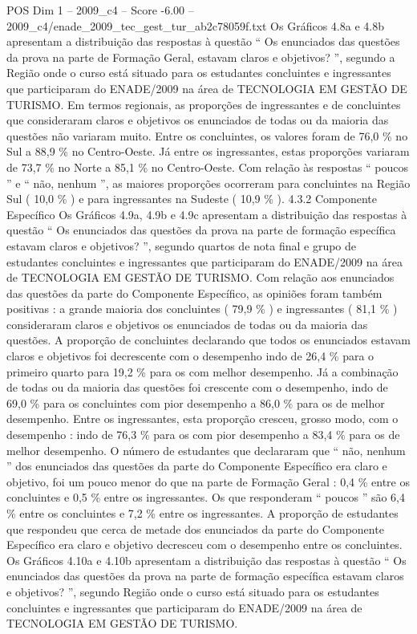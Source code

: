 \begin{textsample}{POS Dim 1 – 2009\_c4 – Score -6.00 – 2009\_c4/enade\_2009\_tec\_gest\_tur\_ab2c78059f.txt}
Os Gráficos 4.8a e 4.8b apresentam a distribuição das respostas à questão “ Os enunciados das questões da prova na parte de Formação Geral, estavam claros e objetivos? ”, segundo a Região onde o curso está situado para os estudantes concluintes e ingressantes que participaram do ENADE/2009 na área de TECNOLOGIA EM GESTÃO DE TURISMO.
Em termos regionais, as proporções de ingressantes e de concluintes que consideraram claros e objetivos os enunciados de todas ou da maioria das questões não variaram muito.
Entre os concluintes, os valores foram de 76,0 \% no Sul a 88,9 \% no Centro-Oeste.
Já entre os ingressantes, estas proporções variaram de 73,7 \% no Norte a 85,1 \% no Centro-Oeste.
Com relação às respostas “ poucos ” e “ não, nenhum ”, as maiores proporções ocorreram para concluintes na Região Sul ( 10,0 \% ) e para ingressantes na Sudeste ( 10,9 \% ). 4.3.2 Componente Específico Os Gráficos 4.9a, 4.9b e 4.9c apresentam a distribuição das respostas à questão “ Os enunciados das questões da prova na parte de formação específica estavam claros e objetivos? ”, segundo quartos de nota final e grupo de estudantes concluintes e ingressantes que participaram do ENADE/2009 na área de TECNOLOGIA EM GESTÃO DE TURISMO.
Com relação aos enunciados das questões da parte do Componente Específico, as opiniões foram também positivas : a grande maioria dos concluintes ( 79,9 \% ) e ingressantes ( 81,1 \% ) consideraram claros e objetivos os enunciados de todas ou da maioria das questões.
A proporção de concluintes declarando que todos os enunciados estavam claros e objetivos foi decrescente com o desempenho indo de 26,4 \% para o primeiro quarto para 19,2 \% para os com melhor desempenho.
Já a combinação de todas ou da maioria das questões foi crescente com o desempenho, indo de 69,0 \% para os concluintes com pior desempenho a 86,0 \% para os de melhor desempenho.
Entre os ingressantes, esta proporção cresceu, grosso modo, com o desempenho : indo de 76,3 \% para os com pior desempenho a 83,4 \% para os de melhor desempenho.
O número de estudantes que declararam que “ não, nenhum ” dos enunciados das questões da parte do Componente Específico era claro e objetivo, foi um pouco menor do que na parte de Formação Geral : 0,4 \% entre os concluintes e 0,5 \% entre os ingressantes.
Os que responderam “ poucos ” são 6,4 \% entre os concluintes e 7,2 \% entre os ingressantes.
A proporção de estudantes que respondeu que cerca de metade dos enunciados da parte do Componente Específico era claro e objetivo decresceu com o desempenho entre os concluintes.
Os Gráficos 4.10a e 4.10b apresentam a distribuição das respostas à questão “ Os enunciados das questões da prova na parte de formação específica estavam claros e objetivos? ”, segundo Região onde o curso está situado para os estudantes concluintes e ingressantes que participaram do ENADE/2009 na área de TECNOLOGIA EM GESTÃO DE TURISMO.

\end{textsample}
